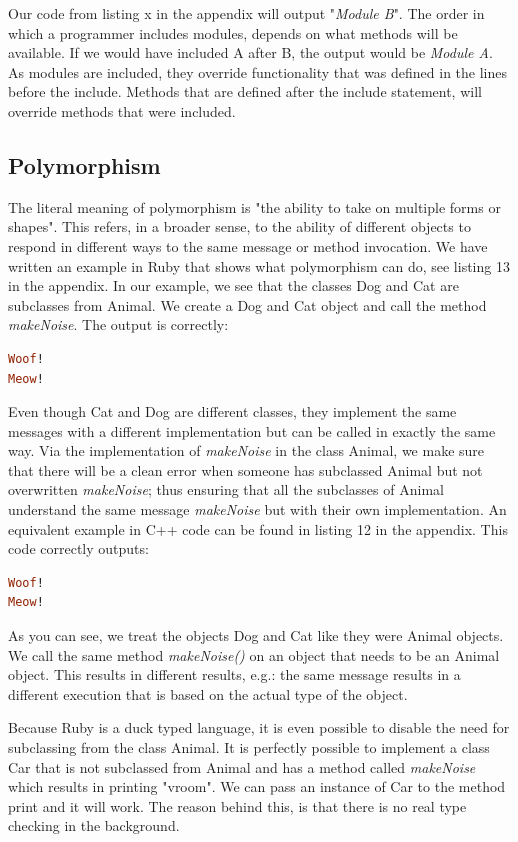 \documentclass[10pt,a4paper,twocolumn]{article}
\begin{document}
Our code from listing x in the appendix will output "\textit{Module B}". The order in which a programmer includes modules, depends on what methods will be available. If we would have included A after B, the output would be \textit{Module A}. As modules are included, they override functionality that was defined in the lines before the include. Methods that are defined after the include statement, will override methods that were included.

\subsection{Polymorphism}
The literal meaning of polymorphism is "the ability to take on multiple forms or shapes". This refers, in a broader sense, to the ability of different objects to respond in different ways to the same message or method invocation. We have written an example in Ruby that shows what polymorphism can do, see listing 13 in the appendix. In our example, we see that the classes Dog and Cat are subclasses from Animal. We create a Dog and Cat object and call the method \textit{makeNoise}. The output is correctly:

\begin{lstlisting}[language=Ruby]
Woof!
Meow!
\end{lstlisting}

Even though Cat and Dog are different classes, they implement the same messages with a different implementation but can be called in exactly the same way. Via the implementation of \textit{makeNoise} in the class Animal, we make sure that there will be a clean error when someone has subclassed Animal but not overwritten \textit{makeNoise}; thus ensuring that all the subclasses of Animal understand the same message \textit{makeNoise} but with their own implementation. An equivalent example in C++ code can be found in listing 12 in the appendix. This code correctly outputs: 

\begin{lstlisting}[language=Ruby]
Woof!
Meow!
\end{lstlisting}

As you can see, we treat the objects Dog and Cat like they were Animal objects. We call the same method \textit{makeNoise()} on an object that needs to be an Animal object. This results in different results, e.g.: the same message results in a different execution that is based on the actual type of the object.

Because Ruby is a duck typed language, it is even possible to disable the need for subclassing from the class Animal. It is perfectly possible to implement a class Car that is not subclassed from Animal and has a method called \textit{makeNoise} which results in printing "vroom". We can pass an instance of Car to the method print and it will work. The reason behind this, is that there is no real type checking in the background.
\end{document}
